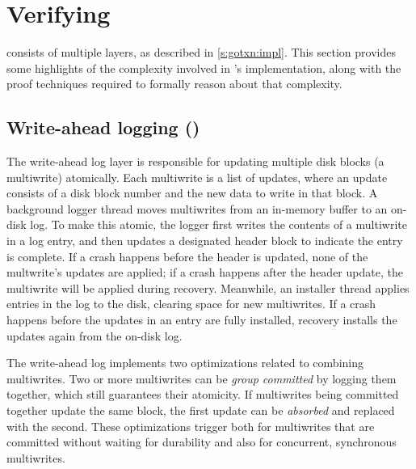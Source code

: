 \section{Verifying \txn}
\label{s:proof}

\txn consists of multiple layers, as described in \cref{s:gotxn:impl}. This
section provides some highlights of the complexity involved in \txn's
implementation, along with the proof techniques required to formally
reason about that complexity.

\subsection{Write-ahead logging ()}

The write-ahead log layer is responsible for updating multiple disk
blocks (a multiwrite) atomically.
Each multiwrite is a list
of updates, where an update consists of a disk block number and the new data to write in that block.
A background logger thread moves multiwrites from an in-memory buffer to an
on-disk log. To make this atomic, the logger first writes
the contents of a multiwrite in a log entry, and then updates a designated header block to indicate
the entry is complete. If a crash
happens before the header is updated, none of the multwrite's updates
are applied; if a crash happens after the header update, the multiwrite
will be applied during recovery.
Meanwhile, an installer thread applies entries in the log to the disk, clearing
space for new multiwrites.
If a crash happens before the updates in an entry are fully installed,
recovery installs the updates again from the on-disk log.

The write-ahead log implements two optimizations related to combining
multiwrites. Two or more multiwrites can be \emph{group committed} by logging
them together, which still guarantees their atomicity. If multiwrites being
committed together update the same block, the first update can be
\emph{absorbed} and replaced with the second. These optimizations trigger both
for multiwrites that are committed without waiting for durability and also for
concurrent, synchronous multiwrites.

%

